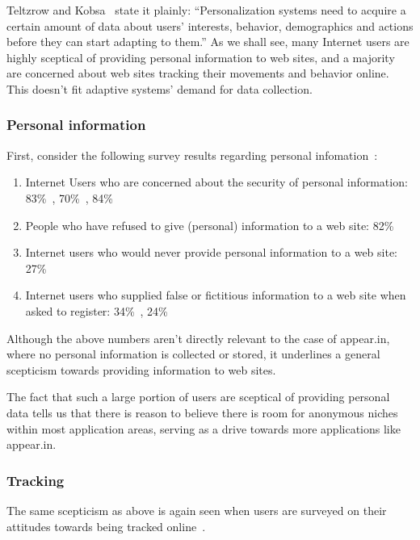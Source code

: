Teltzrow and Kobsa~\cite{Teltzrow2004} state it plainly: ``Personalization systems need to acquire a certain amount of data about users' interests, behavior, demographics and actions before they can start adapting to them.'' As we shall see, many Internet users are highly sceptical of providing personal information to web sites, and a majority are concerned about web sites tracking their movements and behavior online. This doesn't fit adaptive systems' demand for data collection.

\subsubsection{Personal information}

First, consider the following survey results regarding personal infomation~\cite{Teltzrow2004}:

\begin{enumerate}
  \item Internet Users who are concerned about the security of personal information: 83\%~\cite{CyberDialogue2001}, 70\%~\cite{Behrens2001}, 84\%~\cite{Fox2000}
  \item People who have refused to give (personal) information to a web site: 82\%~\cite{Culnan2001}
  \item Internet users who would never provide personal information to a web site: 27\%~\cite{Fox2000}
  \item Internet users who supplied false or fictitious information to a web site when asked to register: 34\%~\cite{Culnan2001}, 24\%~\cite{Fox2000}
\end{enumerate}

Although the above numbers aren't directly relevant to the case of appear.in, where no personal information is collected or stored, it underlines a general scepticism towards providing information to web sites.

The fact that such a large portion of users are sceptical of providing personal data tells us that there is reason to believe there is room for anonymous niches within most application areas, serving as a drive towards more applications like appear.in.

\subsubsection{Tracking}

The same scepticism as above is again seen when users are surveyed on their attitudes towards being tracked online~\cite{Teltzrow2004}.

